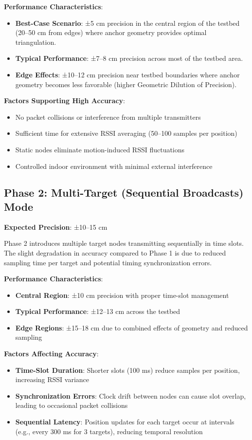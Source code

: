 \textbf{Performance Characteristics}:
\begin{itemize}
    \item \textbf{Best-Case Scenario}: ±5 cm precision in the central region of the testbed (20--50 cm from edges) where anchor geometry provides optimal triangulation.
    \item \textbf{Typical Performance}: ±7--8 cm precision across most of the testbed area.
    \item \textbf{Edge Effects}: ±10--12 cm precision near testbed boundaries where anchor geometry becomes less favorable (higher Geometric Dilution of Precision).
\end{itemize}

\textbf{Factors Supporting High Accuracy}:
\begin{itemize}
    \item No packet collisions or interference from multiple transmitters
    \item Sufficient time for extensive RSSI averaging (50--100 samples per position)
    \item Static nodes eliminate motion-induced RSSI fluctuations
    \item Controlled indoor environment with minimal external interference
\end{itemize}

\subsection{Phase 2: Multi-Target (Sequential Broadcasts) Mode}

\textbf{Expected Precision}: ±10--15 cm

Phase 2 introduces multiple target nodes transmitting sequentially in time slots. The slight degradation in accuracy compared to Phase 1 is due to reduced sampling time per target and potential timing synchronization errors.

\textbf{Performance Characteristics}:
\begin{itemize}
    \item \textbf{Central Region}: ±10 cm precision with proper time-slot management
    \item \textbf{Typical Performance}: ±12--13 cm across the testbed
    \item \textbf{Edge Regions}: ±15--18 cm due to combined effects of geometry and reduced sampling
\end{itemize}

\textbf{Factors Affecting Accuracy}:
\begin{itemize}
    \item \textbf{Time-Slot Duration}: Shorter slots (100 ms) reduce samples per position, increasing RSSI variance
    \item \textbf{Synchronization Errors}: Clock drift between nodes can cause slot overlap, leading to occasional packet collisions
    \item \textbf{Sequential Latency}: Position updates for each target occur at intervals (e.g., every 300 ms for 3 targets), reducing temporal resolution
\end{itemize}

